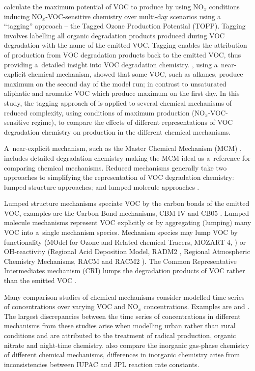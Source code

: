 \documentclass[acpd, online, hvmath]{copernicus}
\begin{document}
\citet{Butler:2011} calculate the maximum potential of VOC to produce
 by using NO$_{x}$ conditions inducing
NO$_{x}$-VOC-sensitive chemistry over multi-day scenarios using a
``tagging'' approach -- the Tagged Ozone Production Potential (TOPP).
Tagging involves labelling all organic degradation products produced
during VOC degradation with the name of the emitted VOC.  Tagging
enables the attribution of  production from VOC degradation
products back to the emitted VOC, thus providing a~detailed insight
into VOC degradation chemistry.  \citet{Butler:2011}, using
a~near-explicit chemical mechanism, showed that some VOC, such as
alkanes, produce maximum  on the second day of the model
run; in contrast to unsaturated aliphatic and aromatic VOC which
produce maximum  on the first day.  In this study, the
tagging approach of \citet{Butler:2011} is applied to several chemical
mechanisms of reduced complexity, using conditions of maximum
 production (NO$_{x}$-VOC-sensitive regime), to compare
the effects of different representations of VOC degradation chemistry
on  production in the different chemical mechanisms.

A~near-explicit mechanism, such as the Master Chemical Mechanism (MCM)
\citep{Jenkin:2003, Saunders:2003, Bloss:2005}, includes detailed
degradation chemistry making the MCM ideal as a~reference for
comparing chemical mechanisms.  Reduced mechanisms generally take two
approaches to simplifying the representation of VOC degradation
chemistry: lumped structure approaches; and lumped molecule approaches
\citep{Dodge:2000}.

Lumped structure mechanisms speciate VOC by the carbon bonds of the
emitted VOC, examples are the Carbon Bond mechanisms, CBM-IV
\citep{Gery:1989} and CB05 \citep{Yarwood:2005}.  Lumped molecule
mechanisms represent VOC explicitly or by aggregating (lumping) many
VOC into a~single mechanism species.  Mechanism species may lump VOC
by functionality (MOdel for Ozone and Related chemical Tracers,
MOZART-4, \citealp{Emmons:2010}) or OH-reactivity (Regional Acid
Deposition Model, RADM2 \citep{Stockwell:1990}, Regional Atmospheric
Chemistry Mechanisms, RACM \citep{Stockwell:1997} and RACM2
\citep{Goliff:2013}).  The Common Representative Intermediates
mechanism (CRI) lumps the degradation products of VOC rather than the
emitted VOC \citep{Jenkin:2008}.

Many comparison studies of chemical mechanisms consider modelled time
series of  concentrations over varying VOC and NO$_{x}$
concentrations.  Examples are \citet{Dunker:1984,Kuhn:1998} and
\citet{Emmerson:2009}.  The largest discrepancies between the time
series of  concentrations in different mechanisms from these
studies arise when modelling urban rather than rural conditions and
are attributed to the treatment of radical production, organic nitrate
and night-time chemistry.  \citet{Emmerson:2009} also compare the
inorganic gas-phase chemistry of different chemical mechanisms,
differences in inorganic chemistry arise from inconsistencies between
IUPAC and JPL reaction rate constants.
\end{document}
